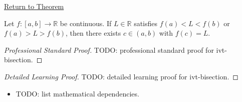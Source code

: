\newpage
{}
\label{prf:ivt-bisection}

\begin{remark*}[Return]
\hyperref[prop:ivt-bisection]{Return to Theorem}
\end{remark*}

\begin{proposition*}
Let $f:[a,b]\to\mathbb{R}$ be continuous. If $L\in\mathbb{R}$ satisfies
$f(a)<L<f(b)$ or $f(a)>L>f(b)$, then there exists $c\in(a,b)$ with
$f(c)=L$.
\end{proposition*}

\begin{proof}[Professional Standard Proof]
\LRAProofBodyStart
TODO: professional standard proof for ivt-bisection.
\end{proof}

\begin{proof}[Detailed Learning Proof]
\LRAProofBodyStart
TODO: detailed learning proof for ivt-bisection.
\end{proof}

\begin{remark*}
\end{remark*}

\begin{dependencies}
\begin{itemize}
  \item TODO: list mathematical dependencies.
\end{itemize}
\end{dependencies}

\clearpage
